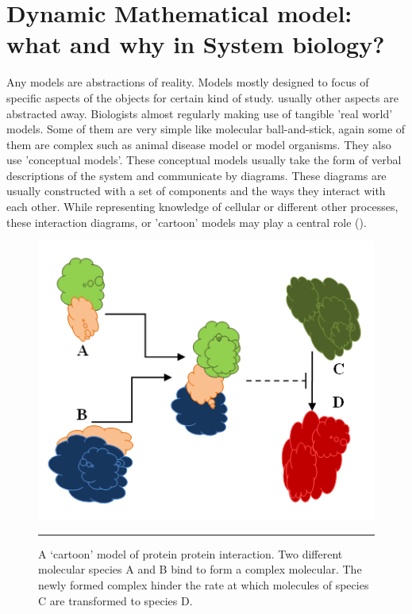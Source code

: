 \section{Dynamic Mathematical model: what and why in System biology?}
Any models are abstractions of reality. Models mostly designed to focus of specific aspects of the objects for
certain kind of study. usually other aspects are abstracted away. Biologists almost regularly making use of tangible
'real world' models. Some of them are very simple like molecular ball-and-stick, again some of them are complex
such as animal disease model or model organisms. They also use 'conceptual models'. These conceptual models
usually take the form of verbal descriptions of the system and communicate by diagrams. These diagrams are
usually constructed with a set of components and the ways they interact with each other. While representing 
knowledge of cellular or different other processes, these interaction diagrams, or 'cartoon' models may play a 
central role (\cite{Ingalls:2012}).

\begin{figure}[b]
	\centering
		\includegraphics[scale=.45]{diagrams/ProtienProtien.PNG}
		\rule{35em}{0.5pt}
	\caption{A ‘cartoon’ model of protein protein interaction. Two different molecular species A and B bind to
		 form a complex molecular. The newly formed complex hinder the rate at which molecules of species 
		 C are transformed to species D.}
	\label{fig:Protein protein interaction}
\end{figure}

